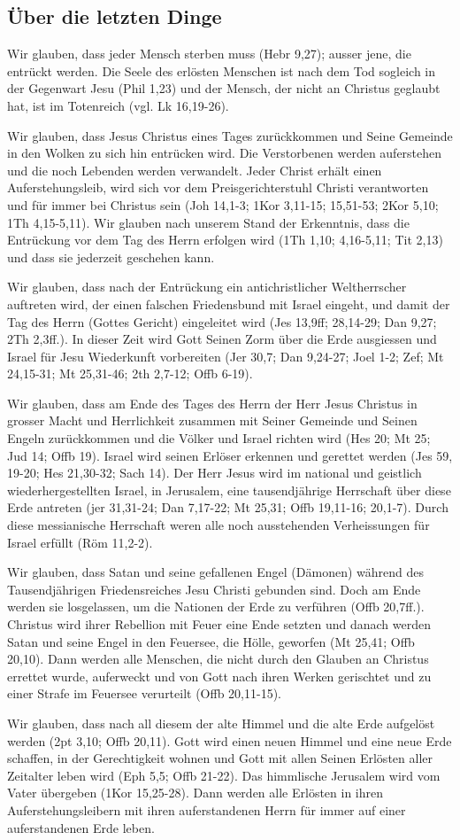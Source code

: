 \documentclass[12pt]{../../inc/mybib}
\begin{document}
\subsection{Über die letzten Dinge}
Wir glauben, dass jeder Mensch sterben muss (Hebr 9,27); ausser jene, die entrückt werden. Die Seele des erlösten Menschen ist nach dem Tod sogleich in der Gegenwart Jesu (Phil 1,23) und der Mensch, der nicht an Christus geglaubt hat, ist im Totenreich (vgl. Lk 16,19-26).

Wir glauben, dass Jesus Christus eines Tages zurückkommen und Seine Gemeinde in den Wolken zu sich hin entrücken wird. Die Verstorbenen werden auferstehen und die noch Lebenden werden verwandelt. Jeder Christ erhält einen Auferstehungsleib, wird sich vor dem Preisgerichterstuhl Christi verantworten und für immer bei Christus sein (Joh 14,1-3; 1Kor 3,11-15; 15,51-53; 2Kor 5,10; 1Th 4,15-5,11). Wir glauben nach unserem Stand der Erkenntnis, dass die Entrückung vor dem Tag des Herrn erfolgen wird (1Th 1,10; 4,16-5,11; Tit 2,13) und dass sie jederzeit geschehen kann.

Wir glauben, dass nach der Entrückung ein antichristlicher Weltherrscher auftreten wird, der einen falschen Friedensbund mit Israel eingeht, und damit der Tag des Herrn (Gottes Gericht) eingeleitet wird (Jes 13,9ff; 28,14-29; Dan 9,27; 2Th 2,3ff.). In dieser Zeit wird Gott Seinen Zorm über die Erde ausgiessen und Israel für Jesu Wiederkunft vorbereiten (Jer 30,7; Dan 9,24-27; Joel 1-2; Zef; Mt 24,15-31; Mt 25,31-46; 2th 2,7-12; Offb 6-19).

Wir glauben, dass am Ende des Tages des Herrn der Herr Jesus Christus in grosser Macht und Herrlichkeit zusammen mit Seiner Gemeinde und Seinen Engeln zurückkommen und die Völker und Israel richten wird (Hes 20; Mt 25; Jud 14; Offb 19). Israel wird seinen Erlöser erkennen und gerettet werden (Jes 59, 19-20; Hes 21,30-32; Sach 14). Der Herr Jesus wird im national und geistlich wiederhergestellten Israel, in Jerusalem, eine tausendjährige Herrschaft über diese Erde antreten (jer 31,31-24; Dan 7,17-22; Mt 25,31; Offb 19,11-16; 20,1-7). Durch diese messianische Herrschaft weren alle noch ausstehenden Verheissungen für Israel erfüllt (Röm 11,2-2).

Wir glauben, dass Satan und seine gefallenen Engel (Dämonen) während des Tausendjährigen Friedensreiches Jesu Christi gebunden sind. Doch am Ende werden sie losgelassen, um die Nationen der Erde zu verführen (Offb 20,7ff.). Christus wird ihrer Rebellion mit Feuer eine Ende setzten und danach werden Satan und seine Engel in den Feuersee, die Hölle, geworfen (Mt 25,41; Offb 20,10). Dann werden alle Menschen, die nicht durch den Glauben an Christus errettet wurde, auferweckt und von Gott nach ihren Werken gerischtet und zu einer Strafe im Feuersee verurteilt (Offb 20,11-15).

Wir glauben, dass nach all diesem der alte Himmel und die alte Erde aufgelöst werden (2pt 3,10; Offb 20,11). Gott wird einen neuen Himmel und eine neue Erde schaffen, in der Gerechtigkeit wohnen und Gott mit allen Seinen Erlösten aller Zeitalter leben wird (Eph 5,5; Offb 21-22). Das himmlische Jerusalem wird vom Vater übergeben (1Kor 15,25-28). Dann werden alle Erlösten in ihren Auferstehungsleibern mit ihren auferstandenen Herrn für immer auf einer auferstandenen Erde leben.
\end{document}

